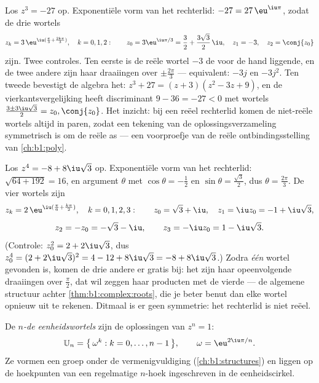 \begin{example}\label{ex:b1:complex:cuberoots}
Los $z^3 = -27$ op. Exponentiële vorm van het rechterlid: $-27 =
27\,\eu^{\iu\pi}$, zodat de drie wortels
\[
z_k = 3\,\eu^{\iu(\frac\pi3 + \frac{2k\pi}3)}, \quad k = 0, 1, 2 :
\qquad
z_0 = 3\eu^{\iu\pi/3} = \frac32 + \frac{3\sqrt3}2\,\iu,
\quad
z_1 = -3,
\quad
z_2 = \conj{z_0}
\]
zijn. Twee controles. Ten eerste is de reële wortel $-3$ de voor de
hand liggende, en de twee andere zijn haar draaiingen over
$\pm\frac{2\pi}3$ --- equivalent: $-3j$ en $-3j^2$. Ten tweede
bevestigt de algebra het: $z^3 + 27 = (z + 3)(z^2 - 3z + 9)$, en de
vierkantsvergelijking heeft discriminant $9 - 36 = -27 < 0$ met
wortels $\frac{3 \pm 3\iu\sqrt3}2 = z_0, \conj{z_0}$. Het inzicht: bij
een reëel rechterlid komen de niet-reële wortels altijd in 
paren, zodat een tekening van de oplossingsverzameling symmetrisch is
om de reële as --- een voorproefje van de reële ontbindingsstelling
van \cref{ch:b1:poly}.
\end{example}

\begin{example}\label{ex:b1:complex:fourthroots}
Los $z^4 = -8 + 8\iu\sqrt3$ op. Exponentiële vorm van het rechterlid:
 $\sqrt{64 + 192} = 16$, en argument $\theta$ met $\cos\theta =
-\frac12$ en $\sin\theta = \frac{\sqrt3}2$, dus $\theta =
\frac{2\pi}3$. De vier wortels zijn
\[
z_k = 2\,\eu^{\iu(\frac\pi6 + \frac{k\pi}2)}, \quad k = 0, 1, 2,
3 :
\qquad
z_0 = \sqrt3 + \iu,\quad z_1 = \iu z_0 = -1 + \iu\sqrt3,
\]
\[
z_2 = -z_0 = -\sqrt3 - \iu,\qquad z_3 = -\iu z_0 = 1 - \iu\sqrt3 .
\]
(Controle: $z_0^2 = 2 + 2\iu\sqrt3$, dus $z_0^4 = (2 + 2\iu\sqrt3)^2 =
4 - 12 + 8\iu\sqrt3 = -8 + 8\iu\sqrt3$.) Zodra \emph{één} wortel
gevonden is, komen de drie andere er gratis bij: het zijn haar
opeenvolgende draaiingen over $\frac\pi2$, dat wil zeggen haar
producten met de vierde  --- de algemene structuur
achter \cref{thm:b1:complex:roots}, die je beter benut dan elke wortel
opnieuw uit te rekenen. Ditmaal is er geen  symmetrie: het
rechterlid is niet reëel.
\end{example}

\begin{definition}[Eenheidswortels]\label{def:b1:complex:unity}
De \emph{$n$-de eenheidswortels} zijn de
oplossingen van $z^n = 1$:
\[
\mathbb{U}_n = \bigl\{\, \omega^k : k = 0, \dots, n-1 \,\bigr\},
\qquad \omega = \eu^{2\iu\pi/n}.
\]
Ze vormen een groep onder de vermenigvuldiging
(\cref{ch:b1:structures}) en liggen op de hoekpunten van een
regelmatige $n$-hoek ingeschreven in de eenheidscirkel.
\end{definition}

